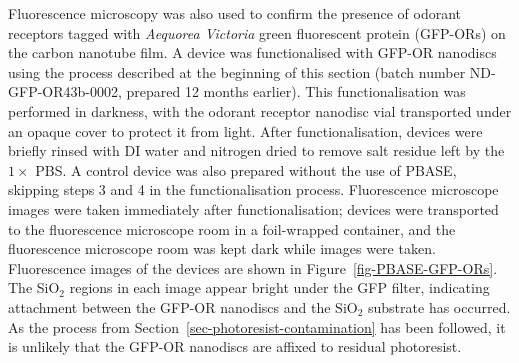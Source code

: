 \documentclass[
  a4paper,
]{scrbook}
\begin{document}
Fluorescence microscopy was also used to confirm the presence of odorant
receptors tagged with \emph{Aequorea Victoria} green fluorescent protein
(GFP-ORs) on the carbon nanotube film. A device was functionalised with
GFP-OR nanodiscs using the process described at the beginning of this
section (batch number ND-GFP-OR43b-0002, prepared 12 months earlier).
This functionalisation was performed in darkness, with the odorant
receptor nanodisc vial transported under an opaque cover to protect it
from light. After functionalisation, devices were briefly rinsed with DI
water and nitrogen dried to remove salt residue left by the \(1 \times\)
PBS. A control device was also prepared without the use of PBASE,
skipping steps 3 and 4 in the functionalisation process. Fluorescence
microscope images were taken immediately after functionalisation;
devices were transported to the fluorescence microscope room in a
foil-wrapped container, and the fluorescence microscope room was kept
dark while images were taken. Fluorescence images of the devices are
shown in Figure~\ref{fig-PBASE-GFP-ORs}. The SiO\(_2\) regions in each
image appear bright under the GFP filter, indicating attachment between
the GFP-OR nanodiscs and the SiO\(_2\) substrate has occurred. As the
process from Section~\ref{sec-photoresist-contamination} has been
followed, it is unlikely that the GFP-OR nanodiscs are affixed to
residual photoresist.
\end{document}
